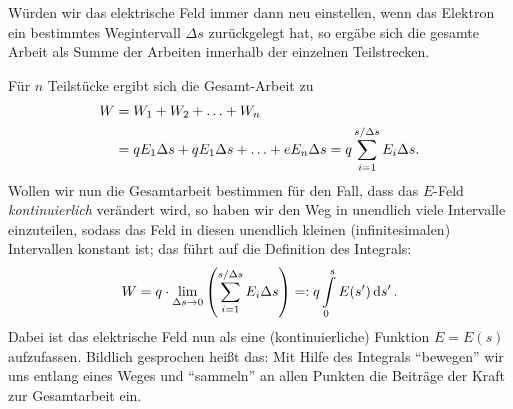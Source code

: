 Würden wir das elektrische Feld immer dann neu einstellen, wenn das Elektron ein bestimmtes Wegintervall $\Delta s$ zurückgelegt hat, so ergäbe sich die gesamte Arbeit als Summe der Arbeiten innerhalb der einzelnen Teilstrecken.
\begin{figure}[htp]
    \centering
\end{figure}
Für $n$ Teilstücke ergibt sich die Gesamt-Arbeit zu 
\begin{align}
    W &= W_1 + W_2 + \hdots + W_n \notag \\
      &= q E_1 \Delta s + q E_1 \Delta s + \hdots + e E_n \Delta s = q \sum_{i=1}^{s/\Delta s} E_i \Delta s.
\end{align} 
Wollen wir nun die Gesamtarbeit bestimmen für den Fall, dass das $E$-Feld \emph{kontinuierlich} verändert wird, so haben wir den Weg in unendlich viele Intervalle einzuteilen, sodass das Feld in diesen unendlich kleinen (infinitesimalen) Intervallen konstant ist; das führt auf die Definition des Integrals: 
\begin{align}
    W = q \cdot \lim_{\Delta s \to 0} \qty(\sum_{i=1}^{s/\Delta s} E_i \Delta s) =: q\int\limits_{0}^{s} E(s') \dd{s'}.
\end{align}
Dabei ist das elektrische Feld nun als eine (kontinuierliche) Funktion $E = E(s)$ aufzufassen. Bildlich gesprochen heißt das: Mit Hilfe des Integrals ``bewegen'' wir uns entlang eines Weges und ``sammeln'' an allen Punkten die Beiträge der Kraft zur Gesamtarbeit ein. 
